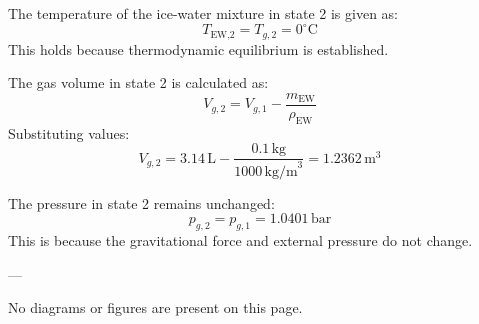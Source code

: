 The temperature of the ice-water mixture in state 2 is given as:  
\[
T_{\text{EW,2}} = T_{g,2} = 0^\circ\text{C}
\]  
This holds because thermodynamic equilibrium is established.  

The gas volume in state 2 is calculated as:  
\[
V_{g,2} = V_{g,1} - \frac{m_{\text{EW}}}{\rho_{\text{EW}}}
\]  
Substituting values:  
\[
V_{g,2} = 3.14 \, \text{L} - \frac{0.1 \, \text{kg}}{1000 \, \text{kg/m}^3} = 1.2362 \, \text{m}^3
\]  

The pressure in state 2 remains unchanged:  
\[
p_{g,2} = p_{g,1} = 1.0401 \, \text{bar}
\]  
This is because the gravitational force and external pressure do not change.  

---

No diagrams or figures are present on this page.